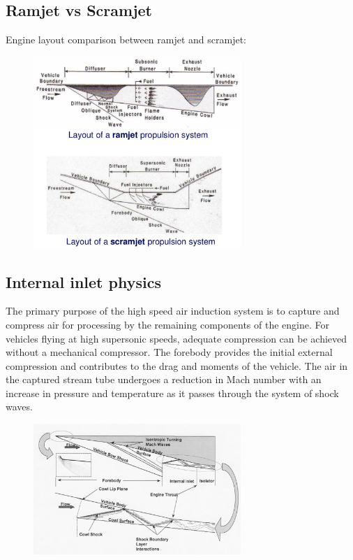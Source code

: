 \documentclass[12pt]{article}
\begin{document}
\subsection{Ramjet vs Scramjet}

Engine layout comparison between ramjet and scramjet:

\begin{figure}[h!]
\centering
\includegraphics[width=0.7\textwidth]{figures/ramvsscra.png}
\end{figure}

\subsection{Internal inlet physics}

The primary purpose of the high speed air induction system is to capture and compress air for processing by the remaining components of the engine. For vehicles flying at high supersonic speeds, adequate compression can be achieved without a mechanical compressor. The forebody provides the initial external compression and contributes to the drag and moments of the vehicle. The air in the captured stream tube undergoes a reduction in Mach number with an increase in pressure and temperature as it passes through the system of shock waves.

\begin{figure}[h!]
\centering
\includegraphics[width=0.7\textwidth]{figures/scram2.png}
\end{figure}
\end{document}
